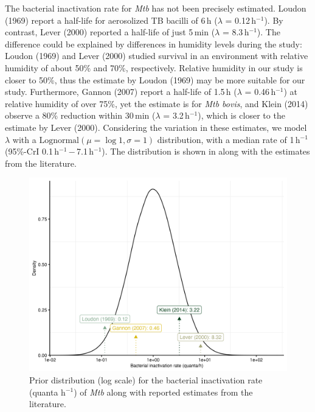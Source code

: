 \documentclass[fleqn,11pt]{wlscirep_supp}
\begin{document}
The bacterial inactivation rate for \emph{Mtb} has not been precisely estimated. Loudon (1969)\cite{Loudon1969AMRRD} report a half-life for aerosolized TB bacilli of 6\,h ($\lambda$ = 0.12\,h$^{-1}$). By contrast, Lever (2000)\cite{Lever2000LettersAppliedMicrobio} reported a half-life of just 5\,min ($\lambda$ = 8.3\,h$^{-1}$). The difference could be explained by differences in humidity levels during the study\cite{Lever2000LettersAppliedMicrobio}: Loudon (1969) and Lever (2000) studied survival in an environment with relative humidity of about 50\% and 70\%, respectively. Relative humidity in our study is closer to 50\%, thus the estimate by Loudon (1969) may be more suitable for our study. Furthermore, Gannon (2007)\cite{Gannon2007ResVetSci} report a half-life of 1.5\,h ($\lambda$ = 0.46\,h$^{-1}$) at relative humidity of over 75\%, yet the estimate is for \emph{Mtb bovis}, and Klein (2014)\cite{Klein2014IJMyco} observe a 80\% reduction within 30\,min ($\lambda$ = 3.2\,h$^{-1}$), which is closer to the estimate by Lever (2000). Considering the variation in these estimates, we model $\lambda$ with a $\mathrm{Lognormal}(\mu = \log 1, \sigma = 1)$ distribution, with a median rate of 1\,h$^{-1}$ (95\%-CrI 0.1\,h$^{-1}$\,$-$\,7.1\,h$^{-1}$). The distribution is shown in  along with the estimates from the literature.

\begin{figure}[!htpb]
    \centering
    \includegraphics{results/inputs/bacterial-inactivation-rate.png}
    \caption[Prior distribution for the bacterial inactivation rate]{Prior distribution (log scale) for the bacterial inactivation rate (quanta h$^{-1}$) of \emph{Mtb} along with reported estimates from the literature\cite{Loudon1969AMRRD,Gannon2007ResVetSci,Klein2014IJMyco,Lever2000LettersAppliedMicrobio}.}
    \label{fig:lambda-distribution}
\end{figure}
\end{document}
